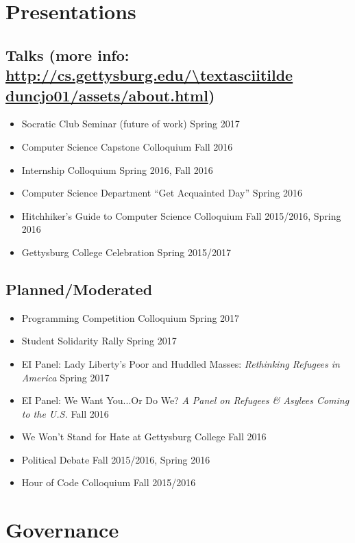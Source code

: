 \documentclass[11pt]{article}
\begin{document}
\section*{Presentations}
\subsection*{Talks (more info: \url{http://cs.gettysburg.edu/\textasciitilde duncjo01/assets/about.html})}
\begin{itemize}[noitemsep]
\item Socratic Club Seminar (future of work) \hfill Spring 2017
\item Computer Science Capstone Colloquium \hfill Fall 2016
\item Internship Colloquium \hfill Spring 2016, Fall 2016
\item Computer Science Department ``Get Acquainted Day'' \hfill Spring 2016
\item Hitchhiker's Guide to Computer Science Colloquium \hfill Fall 2015/2016, Spring 2016
\item Gettysburg College Celebration \hfill Spring 2015/2017
\end{itemize}

\subsection*{Planned/Moderated}
\begin{itemize}[noitemsep]
\item Programming Competition Colloquium \hfill Spring 2017
\item Student Solidarity Rally \hfill Spring 2017
\item EI Panel: Lady Liberty's Poor and Huddled Masses: \textit{Rethinking Refugees in America} \hfill Spring 2017
\item EI Panel: We Want You...Or Do We? \textit{A Panel on Refugees \& Asylees Coming to the U.S.} \hfill Fall 2016
\item We Won't Stand for Hate at Gettysburg College \hfill Fall 2016
\item Political Debate \hfill Fall 2015/2016, Spring 2016
\item Hour of Code Colloquium \hfill Fall 2015/2016
\end{itemize}

\section*{Governance}
\end{document}
